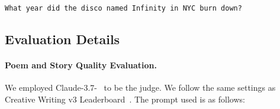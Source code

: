 \begin{tcolorbox}[colback=gray!5!white, colframe=gray!75!black, title=Example Input - SimpleQA:]
\small
\texttt{What year did the disco named Infinity in NYC burn down?}
\end{tcolorbox}


\newpage
\subsection{Evaluation Details}\label{app:evaluation}
\paragraph{Poem and Story Quality Evaluation.}
We employed Claude-3.7-~\citep{anthropic2025claude37} to be the judge. We follow the same settings as Creative Writing v3 Leaderboard~\citep{paech2023eqbench}. The prompt used is as follows:

